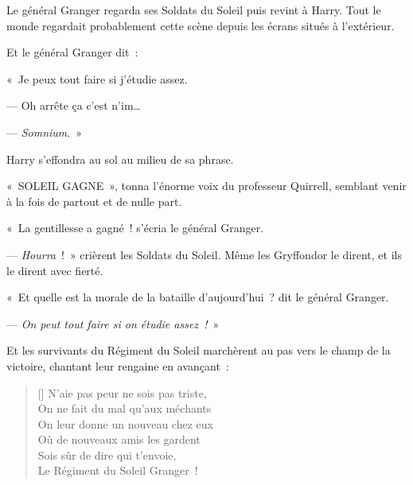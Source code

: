 Le général Granger regarda ses Soldats du Soleil puis revint à Harry. Tout le monde regardait probablement cette scène depuis les écrans situés à l'extérieur.

Et le général Granger dit~:

«~Je peux tout faire si j'étudie assez.

--- Oh arrête ça c'est n'im…

--- \emph{Somnium}.~»

Harry s'effondra au sol au milieu de sa phrase.

«~SOLEIL GAGNE~», tonna l'énorme voix du professeur Quirrell, semblant venir à la fois de partout et de nulle part.

«~La gentillesse a gagné~! s'écria le général Granger.

--- \emph{Hourra}~!~» crièrent les Soldats du Soleil. Même les Gryffondor le dirent, et ils le dirent avec fierté.

«~Et quelle est la morale de la bataille d'aujourd'hui~? dit le général Granger.

--- \emph{On peut tout faire si on étudie assez~!}~»

Et les survivants du Régiment du Soleil marchèrent au pas vers le champ de la victoire, chantant leur rengaine en avançant~:

\begin{verse}[\versewidth]
N'aie pas peur ne sois pas triste,\\
On ne fait du mal qu'aux méchants\\
On leur donne un nouveau chez eux\\
Où de nouveaux amis les gardent\\
Sois sûr de dire qui t'envoie,\\
Le Régiment du Soleil Granger~!
\end{verse}

